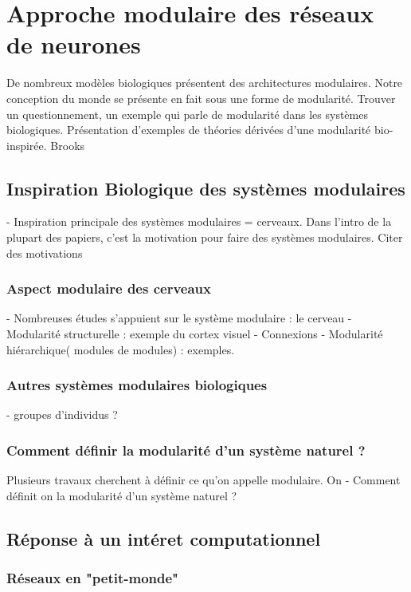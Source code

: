 \chapter{Approche modulaire des réseaux de neurones}
De nombreux modèles biologiques présentent des architectures modulaires. Notre conception du monde se présente en fait sous une forme de modularité.
Trouver un questionnement, un exemple qui parle de modularité dans les systèmes biologiques. 
Présentation d'exemples de théories dérivées d'une modularité bio-inspirée. 
Brooks \cite{brooks_sumsumption_85}



\section{Inspiration Biologique des systèmes modulaires}
- Inspiration principale des systèmes modulaires = cerveaux. Dans l'intro de la plupart des papiers, c'est la motivation pour faire des systèmes modulaires. Citer des motivations 

\subsection{Aspect modulaire des cerveaux}
- Nombreuses études s'appuient sur le système modulaire : le cerveau \cite{primate_cortex_91,mountcastle_columnar_1997,binzegger05}
- Modularité structurelle : exemple du cortex visuel
- Connexions
- Modularité hiérarchique( modules de modules) : exemples. 
\subsection{Autres systèmes modulaires biologiques}
- groupes d'individus ? 
\subsection{Comment définir la modularité d'un système naturel ?}
Plusieurs travaux cherchent à définir ce qu'on appelle modulaire. On 
- Comment définit on la modularité d'un système naturel ? \cite{Meunier2010ModularAH,Siebert2020RoleOM}

\section{Réponse à un intéret computationnel}

\subsection{Réseaux en "petit-monde"}
